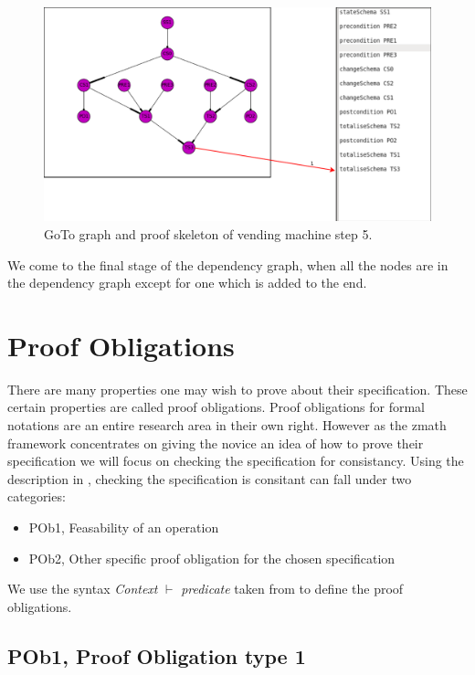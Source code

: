 \begin{figure}[H]
\includegraphics[scale=0.3]{Figures/skeleton/5.png}
\caption{GoTo graph and proof skeleton of vending machine step 5.}
\label{fig:5}
\end{figure}

We come to the final stage of the dependency graph, when all the nodes are in the dependency graph except for one which is added to the end.

\section{Proof Obligations}
\label{sec:proofobl}

There are many properties one may wish to prove about their specification. These certain properties are called proof obligations. Proof obligations for formal notations are an entire research area in their own right. However as the \gls{zmath} framework concentrates on giving the novice an idea of how to prove their specification we will focus on checking the specification for consistancy. Using the description in \cite{DBLP:conf/icsea/WenMZ06}, checking the specification is consitant can fall under two categories:

\begin{itemize}
\item POb1, Feasability of an operation
\item POb2, Other specific proof obligation for the chosen specification
\end{itemize}

We use the syntax \textit{Context} $\vdash$ \textit{predicate} taken from \cite{DBLP:conf/icsea/WenMZ06} to define the proof obligations.

\subsection{POb1, Proof Obligation type 1}

